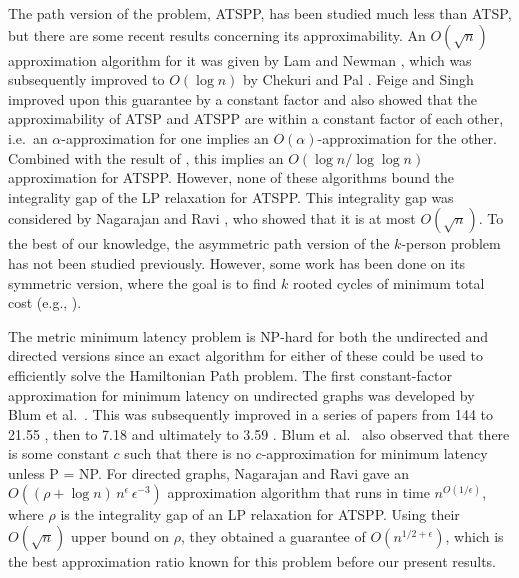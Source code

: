 \documentclass[11pt]{article}
\begin{document}
The path version of the problem, ATSPP, has been studied much less than ATSP, but there are some recent results concerning its approximability.
An $O(\sqrt{n})$ approximation algorithm for it was given by Lam and 
Newman \cite{lam:newman}, which 
was subsequently improved to $O(\log n)$ by Chekuri and Pal \cite{chekuri:pal:atspp}. 
Feige and Singh \cite{feige:singh} improved upon this guarantee by a constant factor and also showed that the 
approximability of ATSP and \mbox{ATSPP} are within a constant factor of each other, i.e.\ an $\alpha$-approximation for one implies an $O(\alpha)$-approximation for the other. Combined with the result of \cite{asadpour:atsp}, this implies an $O(\log n/ \log \log n)$ approximation for ATSPP. 
However, none of these algorithms bound the integrality gap of the LP relaxation for ATSPP. This integrality gap was considered by Nagarajan and 
Ravi \cite{nagarajan:ravi:latency}, who showed that it is at most $O(\sqrt{n})$.
To the best of our knowledge, the asymmetric path version of the $k$-person problem has not been studied previously. However, some work has been done on its symmetric version, where the goal is to find $k$ rooted cycles of minimum total cost (e.g., \cite{frieze:kperson}).


The metric minimum latency problem is NP-hard for both the undirected and directed versions since an exact algorithm for either of these could be used to efficiently solve the Hamiltonian Path problem.
The first constant-factor approximation for minimum latency  on undirected graphs was 
developed by Blum et al.\ \cite{blum:chalasani}. This was subsequently improved in 
a series of papers from 144 to 21.55 \cite{goemans:kleinberg}, then to 7.18 \cite{archer:levin:williamson} and ultimately to 3.59 \cite{chaudhuri}. 
Blum et al.\ \cite{blum:chalasani} also observed that
there is some constant $c$ such that there
is no $c$-approximation for  minimum latency unless P = NP.
For directed graphs, Nagarajan and Ravi \cite{nagarajan:ravi:latency}
gave an $O((\rho+\log n)\, n^{\epsilon}\, \epsilon^{-3})$ approximation algorithm that runs in time $n^{O(1/\epsilon)}$,
where $\rho$ is the integrality gap of an LP relaxation for ATSPP.
Using their $O(\sqrt n)$ upper bound on $\rho$, they 
obtained a guarantee of $O(n^{1/2 + \epsilon})$, which is the best approximation ratio known for this problem before our present results.
\end{document}
